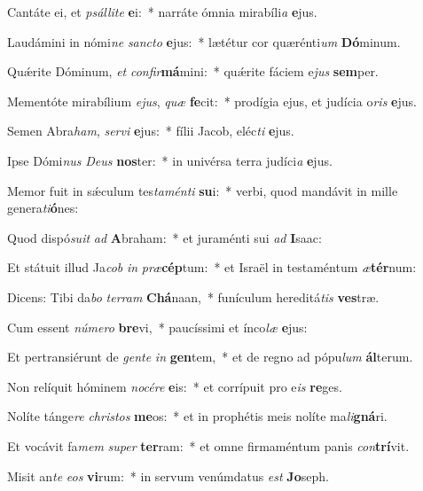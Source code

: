 \item Cantáte ei, et \textit{psál}\textit{li}\textit{te} \textbf{e}i:~* narráte ómnia mirabíli\textit{a} \textbf{e}jus.
\item Laudámini in nómi\textit{ne} \textit{sanc}\textit{to} \textbf{e}jus:~* lætétur cor quærénti\textit{um} \textbf{Dó}minum.
\item Quǽrite Dóminum, \textit{et} \textit{con}\textit{fir}\textbf{má}mini:~* quǽrite fáciem e\textit{jus} \textbf{sem}per.
\item Mementóte mirabílium \textit{e}\textit{jus}, \textit{quæ} \textbf{fe}cit:~* prodígia ejus, et judícia o\textit{ris} \textbf{e}jus.
\item Semen Abra\textit{ham}, \textit{ser}\textit{vi} \textbf{e}jus:~* fílii Jacob, eléc\textit{ti} \textbf{e}jus.
\item Ipse Dómi\textit{nus} \textit{De}\textit{us} \textbf{nos}ter:~* in univérsa terra judíci\textit{a} \textbf{e}jus.
\item Memor fuit in sǽculum tes\textit{ta}\textit{mén}\textit{ti} \textbf{su}i:~* verbi, quod mandávit in mille genera\textit{ti}\textbf{ó}nes:
\item Quod dispó\textit{su}\textit{it} \textit{ad} \textbf{A}braham:~* et juraménti sui \textit{ad} \textbf{I}saac:
\item Et státuit illud Ja\textit{cob} \textit{in} \textit{præ}\textbf{cép}tum:~* et Israël in testaméntum \textit{æ}\textbf{tér}num:
\item Dicens: Tibi da\textit{bo} \textit{ter}\textit{ram} \textbf{Chá}naan,~* funículum hereditá\textit{tis} \textbf{ves}træ.
\item Cum essent \textit{nú}\textit{me}\textit{ro} \textbf{bre}vi,~* paucíssimi et ínco\textit{læ} \textbf{e}jus:
\item Et pertransiérunt de \textit{gen}\textit{te} \textit{in} \textbf{gen}tem,~* et de regno ad pópu\textit{lum} \textbf{ál}terum.
\item Non relíquit hóminem \textit{no}\textit{cé}\textit{re} \textbf{e}is:~* et corrípuit pro e\textit{is} \textbf{re}ges.
\item Nolíte tánge\textit{re} \textit{chris}\textit{tos} \textbf{me}os:~* et in prophétis meis nolíte ma\textit{li}\textbf{gná}ri.
\item Et vocávit fa\textit{mem} \textit{su}\textit{per} \textbf{ter}ram:~* et omne firmaméntum panis \textit{con}\textbf{trí}vit.
\item Misit an\textit{te} \textit{e}\textit{os} \textbf{vi}rum:~* in servum venúmdatus \textit{est} \textbf{Jo}seph.

